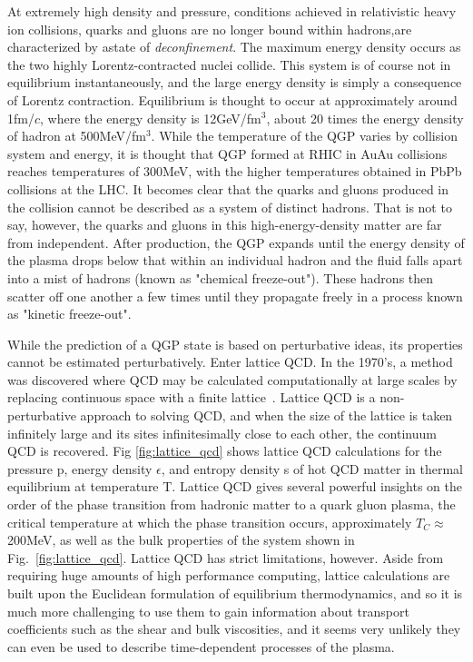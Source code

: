 At extremely high density and pressure, conditions achieved in relativistic heavy ion collisions, quarks and gluons are no longer bound within hadrons,are characterized by astate of \textit{deconfinement}. The maximum energy density occurs as the two highly Lorentz-contracted nuclei collide. This system is of course not in equilibrium instantaneously, and the large energy density is simply a consequence of Lorentz contraction. Equilibrium is thought to occur at approximately around 1fm/$c$, where the energy density is 12GeV/fm$^3$, about 20 times the energy density of hadron at 500MeV/fm$^3$. While the temperature of the QGP varies by collision system and energy, it is thought that QGP formed at RHIC in AuAu collisions reaches temperatures of 300MeV, with the higher temperatures obtained in PbPb collisions at the LHC. It becomes clear that the quarks and gluons produced in the collision cannot be described as a system of distinct hadrons. That is not to say, however, the quarks and gluons in this high-energy-density matter are far from independent. After production, the QGP expands until the energy density of the plasma drops below that within an individual hadron and the fluid falls apart into a mist of hadrons (known as "chemical freeze-out"). These hadrons then scatter off one another a few times until they propagate freely in a process known as "kinetic freeze-out".

While the prediction of a QGP state is based on perturbative ideas, its properties cannot be estimated perturbatively. Enter lattice QCD. In the 1970's, a method was discovered where QCD may be calculated computationally at large scales by replacing continuous space with a finite lattice~\cite{Wilson1974}. Lattice QCD is a non-perturbative approach to solving QCD, and when the size of the lattice is taken infinitely large and its sites infinitesimally close to each other, the continuum QCD is recovered. Fig \ref{fig:lattice_qcd} shows lattice QCD calculations for the  pressure p, energy density $\epsilon$, and entropy density s of hot QCD matter in thermal equilibrium at temperature T. Lattice QCD gives several powerful insights on the order of the phase transition from hadronic matter to a quark gluon plasma, the critical temperature at which the phase transition occurs, approximately $T_C\approx$200MeV, as well as the bulk properties of the system shown in Fig.~\ref{fig:lattice_qcd}. Lattice QCD has strict limitations, however. Aside from requiring huge amounts of high performance computing, lattice calculations are built upon the Euclidean formulation of equilibrium thermodynamics, and so it is much more challenging to use them to gain information about transport coefficients such as the shear and bulk viscosities, and it seems very unlikely they can even be used to describe time-dependent processes of the plasma.


